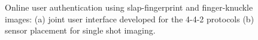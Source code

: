\begin{figure}
    \centering
    \hspace{0.1in}
    \caption{Online user authentication using slap-fingerprint and finger-knuckle images: (a) joint user interface developed for the 4-4-2 protocols (b) sensor placement for single shot imaging.}
\end{figure}